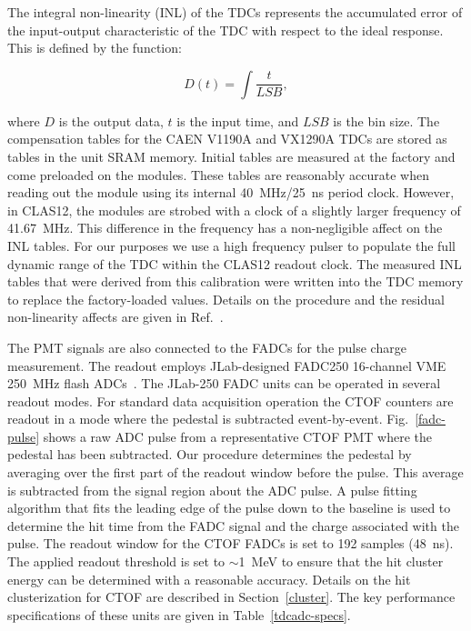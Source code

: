 \documentclass{elsart}
\begin{document}
The integral non-linearity (INL) of the TDCs represents the accumulated error of the input-output
characteristic of the TDC with respect to the ideal response. This is defined by the function:

\begin{equation}
D(t) = \int \frac{t}{LSB},
\end{equation}

\noindent
where $D$ is the output data, $t$ is the input time, and $LSB$ is the bin size. The compensation tables
for the CAEN V1190A and VX1290A TDCs are stored as tables in the unit SRAM memory. Initial tables
are measured at the factory and come preloaded on the modules. These tables are reasonably accurate
when reading out the module using its internal 40~MHz/25~ns period clock. However, in CLAS12, the
modules are strobed with a clock of a slightly larger frequency of 41.67~MHz. This difference in the
frequency has a non-negligible affect on the INL tables. For our purposes we use a high frequency pulser
to populate the full dynamic range of the TDC within the CLAS12 readout clock. The measured INL tables
that were derived from this calibration were written into the TDC memory to replace the factory-loaded
values. Details on the procedure and the residual non-linearity affects are given in Ref.~\cite{inl-tables}.

The PMT signals are also connected to the FADCs for the pulse charge measurement. The readout
employs JLab-designed FADC250 16-channel VME 250~MHz flash ADCs~\cite{fadc-manual}. The
JLab-250 FADC units can be operated in several readout modes. For standard data acquisition operation
the CTOF counters are readout in a mode where the pedestal is subtracted event-by-event.
Fig.~\ref{fadc-pulse} shows a raw ADC pulse from a representative CTOF PMT where the pedestal has 
been subtracted. Our procedure determines the pedestal by averaging over the first part of the
readout window before the pulse. This average is subtracted from the signal region about the ADC
pulse. A pulse fitting algorithm that fits the leading edge of the pulse down to the baseline is used to
determine the hit time from the FADC signal and the charge associated with the pulse. The readout window
for the CTOF FADCs is set to 192 samples (48~ns). The applied readout threshold is set to $\sim$1~MeV
to ensure that the hit cluster energy can be determined with a reasonable accuracy. Details on the hit
clusterization for CTOF are described in Section~\ref{cluster}. The key performance specifications of
these units are given in Table~\ref{tdcadc-specs}.
\end{document}

